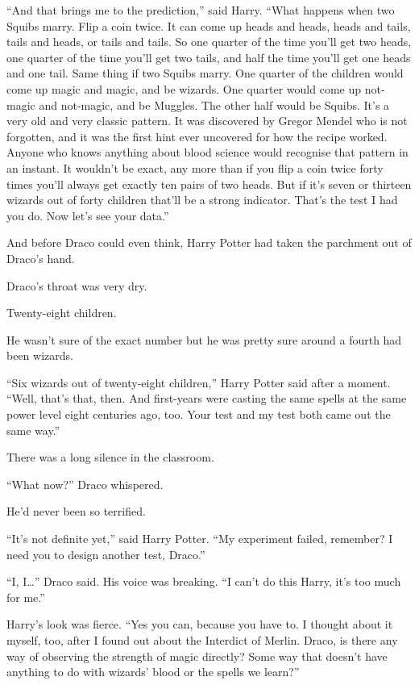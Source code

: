``And that brings me to the prediction,'' said Harry. ``What happens
when two Squibs marry. Flip a coin twice. It can come up heads and
heads, heads and tails, tails and heads, or tails and tails. So one
quarter of the time you'll get two heads, one quarter of the time you'll
get two tails, and half the time you'll get one heads and one tail. Same
thing if two Squibs marry. One quarter of the children would come up
magic and magic, and be wizards. One quarter would come up not-magic and
not-magic, and be Muggles. The other half would be Squibs. It's a very
old and very classic pattern. It was discovered by Gregor Mendel who is
not forgotten, and it was the first hint ever uncovered for how the
recipe worked. Anyone who knows anything about blood science would
recognise that pattern in an instant. It wouldn't be exact, any more
than if you flip a coin twice forty times you'll always get exactly ten
pairs of two heads. But if it's seven or thirteen wizards out of forty
children that'll be a strong indicator. That's the test I had you do.
Now let's see your data.''

And before Draco could even think, Harry Potter had taken the parchment
out of Draco's hand.

Draco's throat was very dry.

Twenty-eight children.

He wasn't sure of the exact number but he was pretty sure around a
fourth had been wizards.

``Six wizards out of twenty-eight children,'' Harry Potter said after a
moment. ``Well, that's that, then. And first-years were casting the same
spells at the same power level eight centuries ago, too. Your test and
my test both came out the same way.''

There was a long silence in the classroom.

``What now?'' Draco whispered.

He'd never been so terrified.

``It's not definite yet,'' said Harry Potter. ``My experiment failed,
remember? I need you to design another test, Draco.''

``I, I\ldots{}'' Draco said. His voice was breaking. ``I can't do this
Harry, it's too much for me.''

Harry's look was fierce. ``Yes you can, because you have to. I thought
about it myself, too, after I found out about the Interdict of Merlin.
Draco, is there any way of observing the strength of magic directly?
Some way that doesn't have anything to do with wizards' blood or the
spells we learn?''

